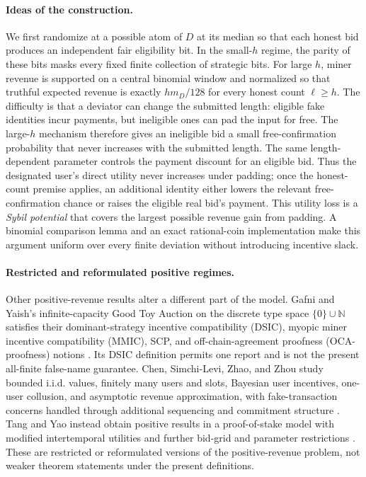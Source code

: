 \documentclass[11pt]{article}
\begin{document}
\paragraph{Ideas of the construction.}
We first randomize at a possible atom of $D$ at its median so that each honest
bid produces an independent fair eligibility bit.  In the small-$h$ regime,
the parity of these bits masks every fixed finite collection of strategic
bits.  For large $h$, miner revenue is supported on a central binomial window
and normalized so that truthful expected revenue is exactly $hm_D/128$ for
every honest count $\ell\ge h$.  The difficulty is that a deviator can change
the submitted length: eligible fake identities incur payments, but ineligible
ones can pad the input for free.  The large-$h$ mechanism therefore gives an
ineligible bid a small free-confirmation probability that never increases
with the submitted length.  The same length-dependent parameter controls the
payment discount for an eligible bid.  Thus the designated user's direct
utility never increases under padding; once the honest-count premise applies,
an additional identity either lowers the relevant free-confirmation chance or
raises the eligible real bid's payment.  This utility loss is a \emph{Sybil
potential} that covers the largest possible revenue gain from padding.  A
binomial comparison lemma and an exact rational-coin implementation make this
argument uniform over every finite deviation without introducing incentive
slack.

\paragraph{Restricted and reformulated positive regimes.}
Other positive-revenue results alter a different part of the model.  Gafni
and Yaish's infinite-capacity Good Toy Auction on the discrete type space
$\{0\}\cup\mathbb N$ satisfies their dominant-strategy incentive
compatibility (DSIC), myopic miner incentive compatibility (MMIC), SCP, and
off-chain-agreement proofness (OCA-proofness) notions
\cite{GafniYaish2024Discrete}.  Its DSIC definition permits one report and is
not the present all-finite false-name guarantee.  Chen, Simchi-Levi, Zhao, and
Zhou study bounded i.i.d. values, finitely many users and slots, Bayesian user
incentives, one-user collusion, and asymptotic revenue approximation, with
fake-transaction concerns handled through additional sequencing and
commitment structure \cite{ChenSimchiLeviZhaoZhou2025}.  Tang and Yao instead
obtain positive results in a proof-of-stake model with modified intertemporal
utilities and further bid-grid and parameter restrictions
\cite{TangYao2023PoSTFM}.  These are restricted or reformulated versions of
the positive-revenue problem, not weaker theorem statements under the present
definitions.
\end{document}
